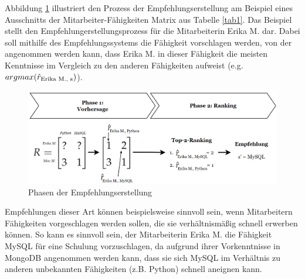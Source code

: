 Abbildung \ref{fig:empfehlungssysteme:recommendation:abb1} illustriert den Prozess der Empfehlungserstellung am Beispiel eines Ausschnitts der Mitarbeiter-Fähigkeiten Matrix aus Tabelle \ref{tab1}.
Das Beispiel stellt den Empfehlungerstellungsprozess für die Mitarbeiterin Erika M. dar.
Dabei soll mithilfe des Empfehlungssystems die Fähigkeit vorschlagen werden, von der angenommen werden kann, dass Erika M. in dieser Fähigkeit die meisten Kenntnisse im Vergleich zu den anderen Fähigkeiten aufweist (e.g. $argmax(\hat{r}_{\textnormal{Erika M., s}})$).

\begin{figure}[H]
    \centering
	\includegraphics[width=1.0\textwidth]{gfx/phasen-empfehlungserstellung.png}
	\caption[Phasen der Empfehlungserstellung]{Phasen der Empfehlungserstellung\\}
	\label{fig:empfehlungssysteme:recommendation:abb1}
\end{figure}

Empfehlungen dieser Art können beispielsweise sinnvoll sein, wenn Mitarbeitern Fähigkeiten vorgeschlagen werden sollen, die sie verhältnismäßig schnell erwerben können.
So kann es sinnvoll sein, der Mitarbeiterin Erika M. die Fähigkeit MySQL für eine Schulung vorzuschlagen, da aufgrund ihrer Vorkenntnisse in MongoDB angenommen werden kann, dass sie sich MySQL im Verhältnis zu anderen unbekannten Fähigkeiten (z.B. Python) schnell aneignen kann.

